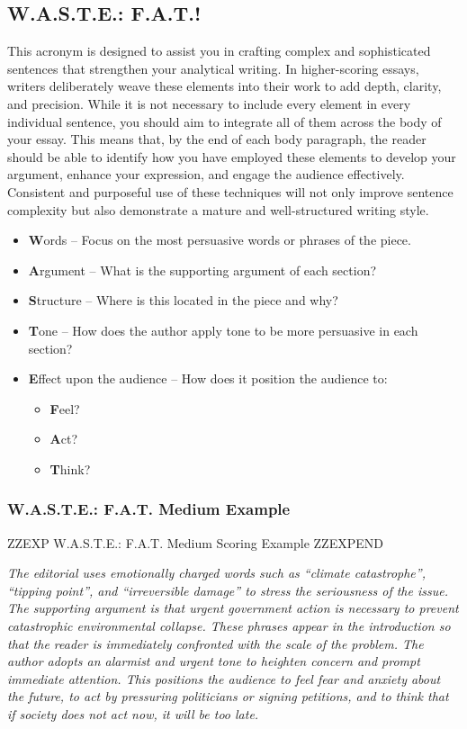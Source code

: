 \documentclass[a4paper]{article}
\begin{document}
\subsection{W.A.S.T.E.: F.A.T.!}
This acronym is designed to assist you in crafting complex and sophisticated sentences that strengthen your analytical writing. In higher-scoring essays, writers deliberately weave these elements into their work to add depth, clarity, and precision. While it is not necessary to include every element in every individual sentence, you should aim to integrate all of them across the body of your essay. This means that, by the end of each body paragraph, the reader should be able to identify how you have employed these elements to develop your argument, enhance your expression, and engage the audience effectively. Consistent and purposeful use of these techniques will not only improve sentence complexity but also demonstrate a mature and well-structured writing style.\\

\begin{itemize}
    \item \textbf{W}ords – Focus on the most persuasive words or phrases of the piece.
    \item \textbf{A}rgument – What is the supporting argument of each section?
    \item \textbf{S}tructure – Where is this located in the piece and why?
    \item \textbf{T}one – How does the author apply tone to be more persuasive in each section?
    \item \textbf{E}ffect upon the audience – How does it position the audience to:
    \begin{itemize}
        \item \textbf{F}eel?
        \item \textbf{A}ct?
        \item \textbf{T}hink?
    \end{itemize}
\end{itemize}

\subsubsection{W.A.S.T.E.: F.A.T. Medium Example}


ZZEXP W.A.S.T.E.: F.A.T. Medium Scoring Example ZZEXPEND


\textit{The editorial uses emotionally charged words such as “climate catastrophe”, “tipping point”, and “irreversible damage” to stress the seriousness of the issue. The supporting argument is that urgent government action is necessary to prevent catastrophic environmental collapse. These phrases appear in the introduction so that the reader is immediately confronted with the scale of the problem. The author adopts an alarmist and urgent tone to heighten concern and prompt immediate attention. This positions the audience to feel fear and anxiety about the future, to act by pressuring politicians or signing petitions, and to think that if society does not act now, it will be too late.}
\end{document}
